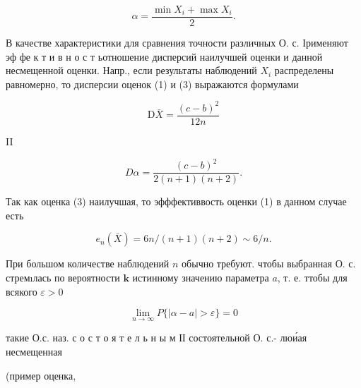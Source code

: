 \documentclass[10pt]{article}
\begin{document}
\[

\alpha=\frac{\min X_{i}+\max X_{i}}{2} .

\]



В качестве характеристики для сравнения точности различных О. с. Ірименяют эф фе к т и в н о с т ьотношение дисперсий наилучшей оценки и данной несмещенной оценки. Напр., если результаты наблюдений $X_{i}$ распределены равномерно, то дисперсии оценок (1) и (3) выражаются формулами



\[

\mathrm{D} \bar{X}=\frac{(c-b)^{2}}{12 n}

\]



II



\[

D \alpha=\frac{(c-b)^{2}}{2(n+1)(n+2)} .

\]



Так как оценка (3) наилучшая, то эфффективвость оценки (1) в данном случае есть



\[

e_{n}(\bar{X})=6 n /(n+1)(n+2) \sim 6 / n .

\]



При большом количестве наблюдений $n$ обычно требуют. чтобы выбранная О. с. стремıлась по вероятности $\mathbf{k}$ истинному значению параметра $a$, т. е. ттобы для всякого $\varepsilon>0$



\[

\lim _{n \rightarrow \infty} P\{|\alpha-a|>\varepsilon\}=0

\]



такие О.с. наз. с о с т о я т е л ь н ы м ІІ состоятельной О. с.- люи́ая несмещенная



(пример оценка,
\end{document}
